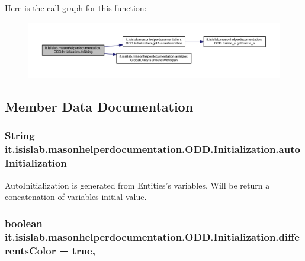 Here is the call graph for this function\-:\nopagebreak
\begin{figure}[H]
\begin{center}
\leavevmode
\includegraphics[width=350pt]{classit_1_1isislab_1_1masonhelperdocumentation_1_1_o_d_d_1_1_initialization_a2ef8e1a36f2b1fdf31fbd256b1667001_cgraph}
\end{center}
\end{figure}




\subsection{Member Data Documentation}
\hypertarget{classit_1_1isislab_1_1masonhelperdocumentation_1_1_o_d_d_1_1_initialization_add84e104d84378945c02ac09899cb527}{
\subsubsection[{auto\-Initialization}]{\setlength{\rightskip}{0pt plus 5cm}String it.\-isislab.\-masonhelperdocumentation.\-O\-D\-D.\-Initialization.\-auto\-Initialization\hspace{0.3cm}{\ttfamily [private]}}}\label{classit_1_1isislab_1_1masonhelperdocumentation_1_1_o_d_d_1_1_initialization_add84e104d84378945c02ac09899cb527}
Auto\-Initialization is generated from Entities's variables. Will be return a concatenation of variables initial value. \hypertarget{classit_1_1isislab_1_1masonhelperdocumentation_1_1_o_d_d_1_1_initialization_aabcc05060ada9fe033fa541c5a6ac1ae}{
\subsubsection[{differents\-Color}]{\setlength{\rightskip}{0pt plus 5cm}boolean it.\-isislab.\-masonhelperdocumentation.\-O\-D\-D.\-Initialization.\-differents\-Color = true\hspace{0.3cm}{\ttfamily [static]}, {\ttfamily [private]}}}\label{classit_1_1isislab_1_1masonhelperdocumentation_1_1_o_d_d_1_1_initialization_aabcc05060ada9fe033fa541c5a6ac1ae}
